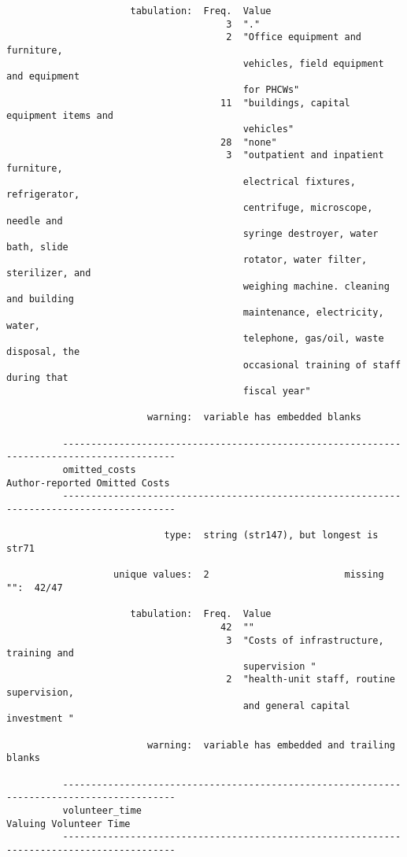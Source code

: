 \documentclass{article}
\begin{document}
\begin{verbatim}
                      tabulation:  Freq.  Value
                                       3  "."
                                       2  "Office equipment and furniture,
                                          vehicles, field equipment and equipment
                                          for PHCWs"
                                      11  "buildings, capital equipment items and
                                          vehicles"
                                      28  "none"
                                       3  "outpatient and inpatient furniture,
                                          electrical fixtures, refrigerator,
                                          centrifuge, microscope, needle and
                                          syringe destroyer, water bath, slide
                                          rotator, water filter, sterilizer, and
                                          weighing machine. cleaning and building
                                          maintenance, electricity, water,
                                          telephone, gas/oil, waste disposal, the
                                          occasional training of staff during that
                                          fiscal year"
          
                         warning:  variable has embedded blanks
          
          ------------------------------------------------------------------------------------------
          omitted_costs                                                Author-reported Omitted Costs
          ------------------------------------------------------------------------------------------
          
                            type:  string (str147), but longest is str71
          
                   unique values:  2                        missing "":  42/47
          
                      tabulation:  Freq.  Value
                                      42  ""
                                       3  "Costs of infrastructure, training and
                                          supervision "
                                       2  "health-unit staff, routine supervision,
                                          and general capital investment "
          
                         warning:  variable has embedded and trailing blanks
          
          ------------------------------------------------------------------------------------------
          volunteer_time                                                      Valuing Volunteer Time
          ------------------------------------------------------------------------------------------
          

\end{verbatim}
\end{document}
